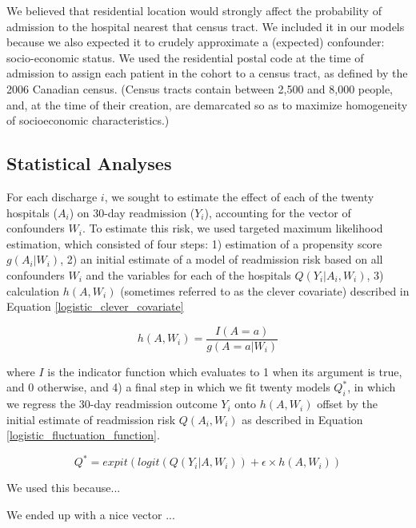 \documentclass[]{article}\usepackage[]{graphicx}\usepackage[]{color}
\begin{document}
We believed that residential location would strongly affect the probability of admission to the hospital nearest that census tract. We included it in our models because we also expected it to crudely approximate a (expected) confounder: socio-economic status.  We used the residential postal code at the time of admission to assign each patient in the cohort to a census tract, as defined by the 2006 Canadian census. (Census tracts contain between 2,500 and 8,000 people, and, at the time of their creation, are demarcated so as to maximize homogeneity of socioeconomic characteristics.)

\subsection{Statistical Analyses}
For each discharge $i$, we sought to estimate the effect of each of the twenty hospitals ($A_i$) on 30-day readmission ($Y_i$), accounting for the vector of confounders $W_i$. To estimate this risk, we used targeted maximum likelihood estimation, which consisted of four steps: 1) estimation of a propensity score $g(A_i|W_i)$, 2) an initial estimate of a model of readmission risk based on all confounders $W_i$ and the variables for each of the hospitals $Q(Y_i|A_i,W_i)$, 3) calculation $h(A,W_i)$ (sometimes referred to as the clever covariate) described in Equation \ref{logistic_clever_covariate}

\begin{equation}
\label{logistic_clever_covariate} 
h(A,W_i)=\frac{I(A=a)}{g(A=a|W_i)}
\end{equation}

where $I$ is the indicator function which evaluates to 1 when its argument is true, and 0 otherwise, and 4) a final step in which we fit twenty models $Q^*_i$, in which we regress the 30-day readmission outcome $Y_i$ onto $h(A,W_i)$ offset by the initial estimate of readmission risk $Q(A_i,W_i)$ as described in Equation \ref{logistic_fluctuation_function}.

\begin{equation}
\label{logistic_fluctuation_function} 
Q^*=expit(logit(Q(Y_i|A,W_i)) + \epsilon \times h(A,W_i))
\end{equation}

We used this because...

We ended up with a nice vector ...
\end{document}
